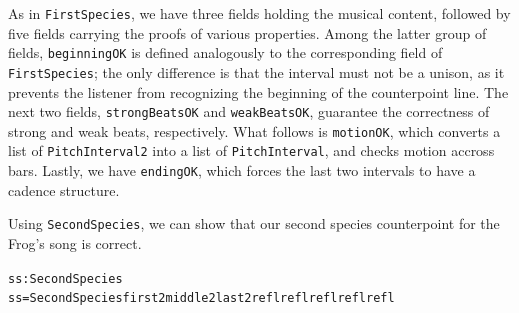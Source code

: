 \noindent As in \texttt{FirstSpecies}, we have three fields holding
the musical content, followed by five fields carrying the proofs of
various properties.
Among the latter group of fields, \texttt{beginningOK} is defined
analogously to the corresponding field of \texttt{FirstSpecies};
the only difference is that the interval must not be a unison,
as it prevents the listener from recognizing the beginning of the
counterpoint line.
The next two fields, \texttt{strongBeatsOK} and \texttt{weakBeatsOK},
guarantee the correctness of strong and weak beats, respectively.
What follows is \texttt{motionOK}, which converts a list of
\texttt{PitchInterval2} into a list of \texttt{PitchInterval}, and checks
motion accross bars.
Lastly, we have \texttt{endingOK}, which forces the last two intervals
to have a cadence structure.

Using \texttt{SecondSpecies}, we can show that our second species
counterpoint for the Frog's song is correct.

\begin{alltt}
ss : SecondSpecies
ss = SecondSpecies first2 middle2 last2 refl refl refl refl refl
\end{alltt}